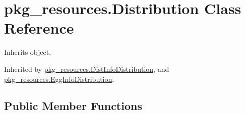 \hypertarget{classpkg__resources_1_1_distribution}{}\section{pkg\+\_\+resources.\+Distribution Class Reference}
\label{classpkg__resources_1_1_distribution}


Inherits object.



Inherited by \hyperlink{classpkg__resources_1_1_dist_info_distribution}{pkg\+\_\+resources.\+Dist\+Info\+Distribution}, and \hyperlink{classpkg__resources_1_1_egg_info_distribution}{pkg\+\_\+resources.\+Egg\+Info\+Distribution}.

\subsection*{Public Member Functions}
